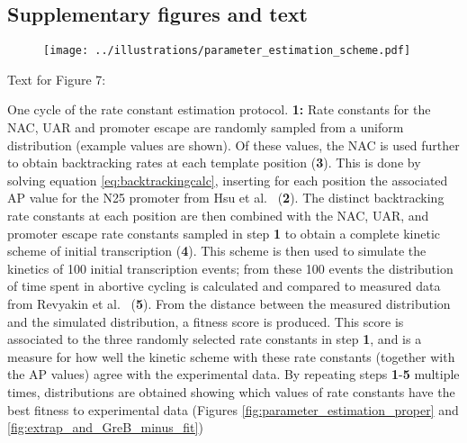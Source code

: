 \subsection{Supplementary figures and text}

\begin{figure}
    \begin{center}
      \texttt{[image: ../illustrations/parameter\_estimation\_scheme.pdf]}
    \end{center}
    \caption{}
    \label{fig:parameter_estimation_scheme}
\end{figure}

Text for Figure 7:

One cycle of the rate constant estimation protocol. \textbf{1:} Rate constants for
the NAC, UAR and promoter escape are randomly sampled from a uniform
distribution (example values are shown). Of these values, the NAC is used
further to obtain backtracking rates at each template position (\textbf{3}).
This is done by solving equation \eqref{eq:backtrackingcalc}, inserting for
each position the associated AP value for the N25 promoter from Hsu et al.\
\cite{hsu_initial_2006} (\textbf{2}). The distinct backtracking rate constants
at each position are then combined with the NAC, UAR, and promoter escape rate
constants sampled in step \textbf{1} to obtain a complete kinetic scheme of
initial transcription (\textbf{4}). This scheme is then used to simulate the
kinetics of 100 initial transcription events; from these 100 events the
distribution of time spent in abortive cycling is calculated and compared to
measured data from Revyakin et al.\ \cite{revyakin_abortive_2006}
(\textbf{5}). From the distance between the measured distribution and the
simulated distribution, a fitness score is produced. This score is associated
to the three randomly selected rate constants in step \textbf{1}, and is a
measure for how well the kinetic scheme with these rate constants (together
with the AP values) agree with the experimental data. By repeating steps
\textbf{1}-\textbf{5} multiple times, distributions are obtained showing which values
of rate constants have the best fitness to experimental data (Figures
\ref{fig:parameter_estimation_proper} and \ref{fig:extrap_and_GreB_minus_fit}) 
